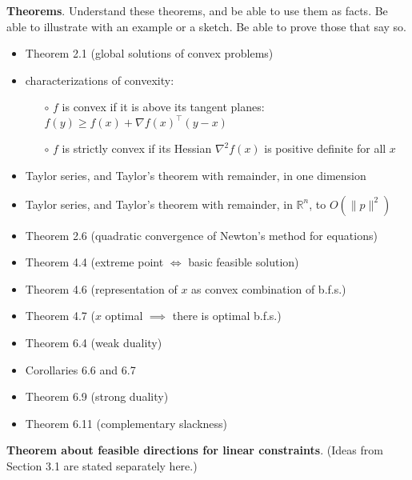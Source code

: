 \documentclass[12pt]{amsart}
\newcommand{\RR}{{\mathbb{R}}}
\newcommand{\grad}{\nabla}
\begin{document}
\medskip
\noindent \textbf{Theorems}.  Understand these theorems, and be able to use them as facts.  Be able to illustrate with an example or a sketch.  Be able to prove those that say so.
\begin{itemize}
\item Theorem 2.1 (global solutions of convex problems) \proveit {}
\item characterizations of convexity: 
    \begin{itemize}
    \item[$\circ$] $f$ is convex if it is above its tangent planes: $f(y) \ge f(x) + \grad f(x)^\top (y-x)$
    \item[$\circ$] $f$ is strictly convex if its Hessian $\grad^2 f(x)$ is positive definite for all $x$
    \end{itemize}
\item Taylor series, and Taylor's theorem with remainder, in one dimension 
\item Taylor series, and Taylor's theorem with remainder, in $\RR^n$, to $O(\|p\|^2)$ 
\item Theorem 2.6 (quadratic convergence of Newton's method for equations) 
\item Theorem 4.4 (extreme point $\iff$ basic feasible solution) 
\item Theorem 4.6 (representation of $x$ as convex combination of b.f.s.) 
\item Theorem 4.7 ($x$ optimal $\implies$ there is optimal b.f.s.) 
\item Theorem 6.4 (weak duality) \proveit {}
\item Corollaries 6.6 and 6.7 \proveit {}
\item Theorem 6.9 (strong duality) 
\item Theorem 6.11 (complementary slackness) 
\end{itemize}

\vfill

\medskip
\noindent \textbf{Theorem about feasible directions for linear constraints}.  (Ideas from Section 3.1 are stated separately here.)
\end{document}
